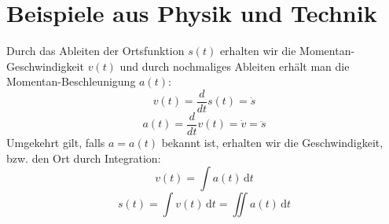 \section{Beispiele aus Physik und Technik} %
\label{sec:beispiele_aus_physik_und_technik}
Durch das Ableiten der Ortsfunktion \( s(t) \) erhalten wir die Momentan-Geschwindigkeit \(v(t)\) und durch nochmaliges Ableiten erhält man die Momentan-Beschleunigung \(a(t)\):
\[ v(t) = \frac { d }{ dt } s(t) = \dot { s } \]
\[ a(t) = \frac { d }{ dt } v(t) = \dot { v } = \ddot{s}\]
Umgekehrt gilt, falls \( a = a(t) \) bekannt ist, erhalten wir die Geschwindigkeit, bzw. den Ort durch Integration:
\[ v(t) = \int a(t)\,\mathrm{d}t \]
\[ s(t) = \int v(t)\,\mathrm{d}t = \iint a(t)\,\mathrm{d}t\]

